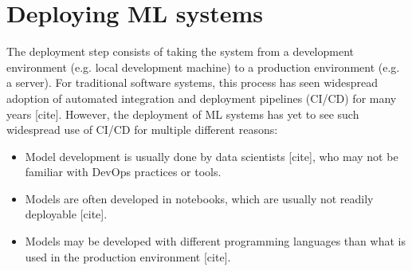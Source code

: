 \section{Deploying ML systems}
The deployment step consists of taking the system from a development environment (e.g. local development machine) to a production environment (e.g. a server).
For traditional software systems, this process has seen widespread adoption of automated integration and deployment pipelines (CI/CD) for many years [cite].
However, the deployment of ML systems has yet to see such widespread use of CI/CD for multiple different reasons:
\begin{itemize}
    \item Model development is usually done by data scientists [cite], who may not be familiar with DevOps practices or tools.
    \item Models are often developed in notebooks, which are usually not readily deployable [cite].
    \item Models may be developed with different programming languages than what is used in the production environment [cite].
\end{itemize}
